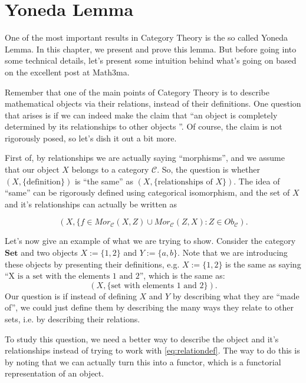 \chapter{Yoneda Lemma}

One of the most important results in Category Theory is the so called Yoneda Lemma.
In this chapter, we present and prove this lemma. But before going into some
technical details, let's present some intuition behind what's
going on based on the excellent post at Math3ma.

Remember that one of the main points of Category Theory is to describe mathematical
objects via their relations, instead of their definitions. One question that
arises is if we can indeed make the claim that ``an object is
completely determined by its relationships to other objects
''. Of course, the claim is not rigorously posed, so let's dish it out a bit more.

First of, by relationships we are actually saying ``morphisms'',
and we assume that our object $X$ belongs to a category $\mathcal C$.
So, the question is whether $(X, \{\text{definition}\})$ is ``the same''
as $(X, \{\text{relationships of }X\})$. The idea of ``same'' can
be rigorously defined using categorical isomorphism, and the
set of $X$ and it's relationships can actually be written as

\begin{equation}
	(X, \{ f \in Mor_\mathcal C(X,Z) \cup Mor_\mathcal C(Z,X): Z \in Ob_\mathcal C).
	\label{eq:relationdef}
\end{equation}

Let's now give an example of what we are trying to show. Consider the category $\mathbf{Set}$
and two objects $X:=\{1,2\}$ and $Y :=\{a,b\}$. Note that we are introducing these objects
by presenting their definitions, e.g. $X:=\{1,2\}$ is the same as saying
``$\text{X is a set with the elements 1 and 2}$'', which is the same as:
\begin{displaymath}
	(X, \{\text{set with elements 1 and 2}\}).
\end{displaymath}
Our question is if instead of
defining $X$ and $Y$ by describing what they are ``made of'', we could just
define them by describing the many ways they relate to other sets, i.e. by describing their relations.

To study this question, we need a better way to describe the object and it's relationships
instead of trying to work with \eqref{eq:relationdef}. The way to do this is
by noting that we can actually turn this into a functor, which is
a functorial representation of an object.

